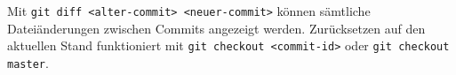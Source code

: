 Mit \lstinline|git diff <alter-commit> <neuer-commit>| können sämtliche Dateiänderungen zwischen Commits angezeigt werden. Zurücksetzen auf den aktuellen Stand funktioniert mit \lstinline|git checkout <commit-id>| oder \lstinline|git checkout master|.

